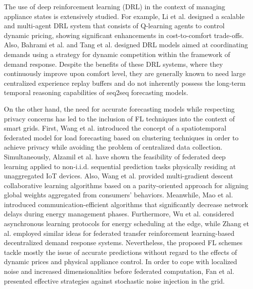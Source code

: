 \documentclass[journal]{IEEEtran}
\begin{document}
The use of deep reinforcement learning (DRL) in the context of managing appliance states is extensively studied. For example, Li et al. \cite{madrl2025} designed a scalable and multi-agent DRL system that consists of Q-learning agents to control dynamic pricing, showing significant enhancements in cost-to-comfort trade-offs. Also, Bahrami et al. \cite{bahrami2021deep} and Tang et al. \cite{tang2024dynamic} designed DRL models aimed at coordinating demands using a strategy for dynamic competition within the framework of demand response. Despite the benefits of these DRL systems, where they continuously improve upon comfort level, they are generally known to need large centralized experience replay buffers and do not inherently possess the long-term temporal reasoning capabilities of seq2seq forecasting models.

On the other hand, the need for accurate forecasting models while respecting privacy concerns has led to the inclusion of FL techniques into the context of smart grids. First, Wang et al. \cite{stfl2025} introduced the concept of a spatiotemporal federated model for load forecasting based on clustering techniques in order to achieve privacy while avoiding the problem of centralized data collection. Simultaneously, Alzamil et al. \cite{alzamil2025federated} have shown the feasibility of federated deep learning applied to non-i.i.d. sequential prediction tasks physically residing at unaggregated IoT devices. Also, Wang et al. \cite{wang2025multi-gradient-descent} provided multi-gradient descent collaborative learning algorithms based on a parity-oriented approach for aligning global weights aggregated from consumers' behaviors. Meanwhile, Mao et al. \cite{mao2023communication-efficient} introduced communication-efficient algorithms that significantly decrease network delays during energy management phases. Furthermore, Wu et al. \cite{wu2025privacy} considered asynchronous learning protocols for energy scheduling at the edge, while Zhang et al. \cite{zhang2026parallel} employed similar ideas for federated transfer reinforcement learning-based decentralized demand response systems. Nevertheless, the proposed FL schemes tackle mostly the issue of accurate predictions without regard to the effects of dynamic prices and physical appliance control. In order to cope with localized noise and increased dimensionalities before federated computation, Fan et al. \cite{fan2025adaptive} presented effective strategies against stochastic noise injection in the grid.
\end{document}
